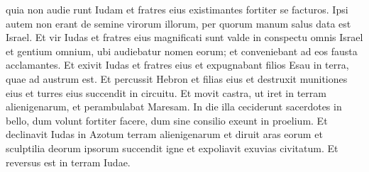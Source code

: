 \begin{biblechapter}
\verse quia non audie runt Iudam et fratres eius existimantes fortiter se facturos. 
\verse Ipsi autem non erant de semine virorum illorum, per quorum manum salus data est Israel. 
\verse Et vir Iudas et fratres eius magnificati sunt valde in conspectu omnis Israel et gentium omnium, ubi audiebatur nomen eorum; 
\verse et conveniebant ad eos fausta acclamantes. 
\verse Et exivit Iudas et fratres eius et expugnabant filios Esau in terra, quae ad austrum est. Et percussit Hebron et filias eius et destruxit munitiones eius et turres eius succendit in circuitu. 
\verse Et movit castra, ut iret in terram alienigenarum, et perambulabat Maresam. 
\verse In die illa ceciderunt sacerdotes in bello, dum volunt fortiter facere, dum sine consilio exeunt in proelium. 
\verse Et declinavit Iudas in Azotum terram alienigenarum et diruit aras eorum et sculptilia deorum ipsorum succendit igne et expoliavit exuvias civitatum. Et reversus est in terram Iudae. 
\end{biblechapter}

